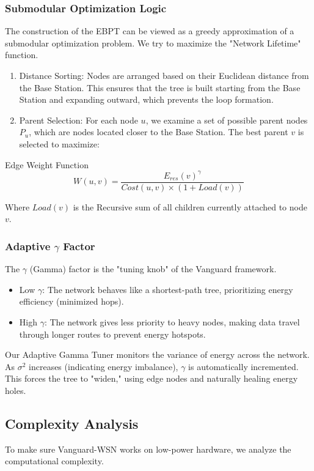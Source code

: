 \documentclass[conference]{IEEEtran}
\begin{document}
\subsubsection{Submodular Optimization Logic}
The construction of the EBPT can be viewed as a greedy approximation of a submodular optimization problem. We try to maximize the "Network Lifetime" function.
\begin{enumerate}
    \item Distance Sorting: Nodes are arranged based on their Euclidean distance from the Base Station. This ensures that the tree is built starting from the Base Station and expanding outward, which prevents the loop formation.
    \item Parent Selection: For each node $u$, we examine a set of possible parent nodes $P_u$, which are nodes located closer to the Base Station. The best parent $v$ is selected to maximize:
\end{enumerate}

Edge Weight Function
\begin{equation}
W(u, v) = \frac{E_{res}(v)^\gamma}{Cost(u, v) \times (1 + Load(v))}
\end{equation}

Where $Load(v)$ is the Recursive sum of all children currently attached to node $v$.

\subsubsection{Adaptive $\gamma$ Factor}
The $\gamma$ (Gamma) factor is the "tuning knob" of the Vanguard framework.
\begin{itemize}
    \item Low $\gamma$: The network behaves like a shortest-path tree, prioritizing energy efficiency (minimized hops).
    \item High $\gamma$: The network gives less priority to heavy nodes, making data travel through longer routes to prevent energy hotspots.
\end{itemize}

Our Adaptive Gamma Tuner monitors the variance of energy across the network. As $\sigma^2$ increases (indicating energy imbalance), $\gamma$ is automatically incremented. This forces the tree to "widen," using edge nodes and naturally healing energy holes.

\subsection{Complexity Analysis}
To make sure Vanguard-WSN works on low-power hardware, we analyze the computational complexity.
\end{document}

